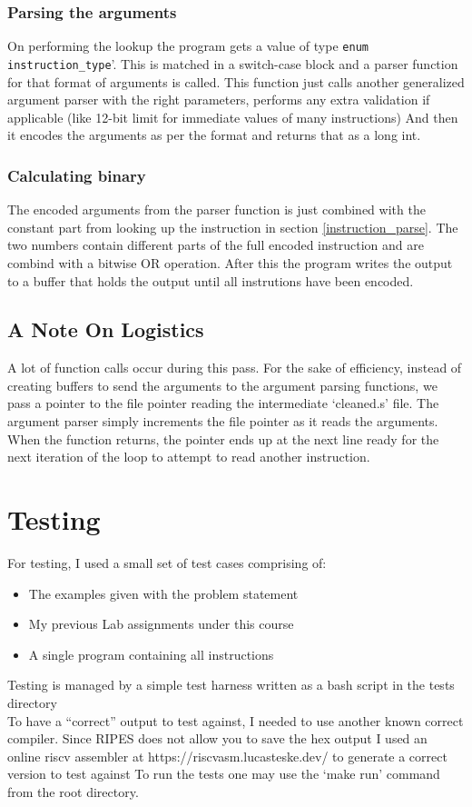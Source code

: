 \documentclass[12pt]{article}
\begin{document}
			\subsubsection{Parsing the arguments}
			On performing the lookup the program gets a value of type \verb|enum instruction_type|'. This is matched in a switch-case block and a parser function for that format of arguments is called.
			This function just calls another generalized argument parser with the right parameters, performs any extra validation if applicable (like 12-bit limit for immediate values of many instructions)
			And then it encodes the arguments as per the format and returns that as a long int.

			\subsubsection{Calculating binary}
			The encoded arguments from the parser function is just combined with the constant part from looking up the instruction in section \ref{instruction_parse}. The two numbers contain different parts of the full encoded instruction and are combind with a bitwise OR operation.
			After this the program writes the output to a buffer that holds the output until all instrutions have been encoded.

			\subsection{A Note On Logistics}
			A lot of function calls occur during this pass. For the sake of efficiency, instead of creating buffers to send the arguments to the argument parsing functions, we pass a pointer to the file pointer reading the intermediate `cleaned.s' file. The argument parser simply increments the file pointer as it reads the arguments. When the function returns, the pointer ends up at the next line ready for the next iteration of the loop to attempt to read another instruction.


	\section{Testing}
	For testing, I used a small set of test cases comprising of:
	\begin{itemize}
		\item{The examples given with the problem statement}
		\item{My previous Lab assignments under this course}
		\item{A single program containing all instructions}
	\end{itemize}
	Testing is managed by a simple test harness written as a bash script in the tests directory\\
	To have a ``correct'' output to test against, I needed to use another known correct compiler. Since RIPES does not allow you to save the hex output I used an online riscv assembler at https://riscvasm.lucasteske.dev/ to generate a correct version to test against
	To run the tests one may use the `make run' command from the root directory.
\end{document}
